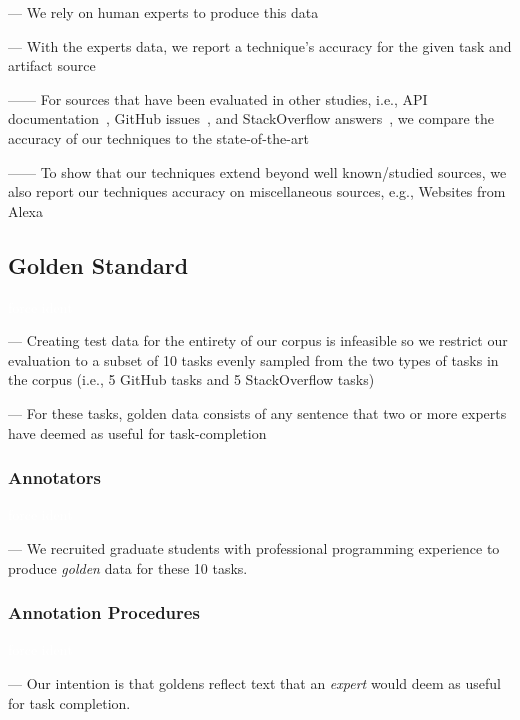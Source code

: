 --- We rely on human experts to produce this data \vspace{3mm}


--- With the experts data, we report a technique's accuracy for the given task and artifact source

------ For sources that have been evaluated in other studies, i.e., API documentation~\cite{Robillard2015}, GitHub issues~\cite{Lotufo2012}, and StackOverflow answers~\cite{Xu2017}, we compare the accuracy of our techniques 
to the state-of-the-art

------ To show that our techniques extend beyond well known/studied sources, we also report our techniques accuracy on miscellaneous sources, e.g., Websites from Alexa



\subsection{Golden Standard}
\textcolor{white}{force ident} %

--- Creating test data for the entirety of our corpus is infeasible so we restrict our evaluation to a subset of 10 tasks evenly sampled from the two types of tasks in the corpus (i.e., 5 GitHub tasks and 5 StackOverflow tasks) \vspace{3mm}

--- For these tasks, golden data consists of any sentence that two or more experts have deemed as useful for task-completion \vspace{3mm}



\subsubsection{Annotators}
\textcolor{white}{force ident} %

--- We recruited  graduate students with professional programming experience to produce \textit{golden} data for these 10 tasks. \vspace{3mm}


\subsubsection{Annotation Procedures}
\textcolor{white}{force ident} %

--- Our intention is that goldens reflect text that an \textit{expert} would deem as useful for task completion. \vspace{3mm}

